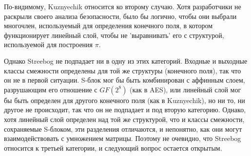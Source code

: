 По-видимому, Kuznyechik относится ко второму случаю. Хотя разработчики не раскрыли своего анализа безопасности, было бы логично, чтобы они выбрали многочлен, используемый для определения конечного поля, в котором функционирует линейный слой, чтобы не 'выравнивать' его с структурой, используемой для построения \(\pi\).

Однако Streebog не подпадает ни в одну из этих категорий. Входные и выходные классы смежности определены для той же структуры (конечного поля), так что он не в первой ситуации. S-блок мог бы быть комбинирован с аффинным слоем, разрушающим его отношение с $GF(2^8)$ (как в AES), или линейный слой мог бы быть определен для другого конечного поля (как в Kuznyechik), но ни то, ни другое не происходит, так что он не подпадает и под вторую категорию. Однако, хотя линейный слой определен над той же структурой, что и классы смежности, сохраняемые S-блоком, эти разделения отличаются, и непонятно, как они могут взаимодействовать с умножением матрицы. Поэтому не очевидно, что Streebog относится к третьей категории, и следующий вопрос остается открытым.


